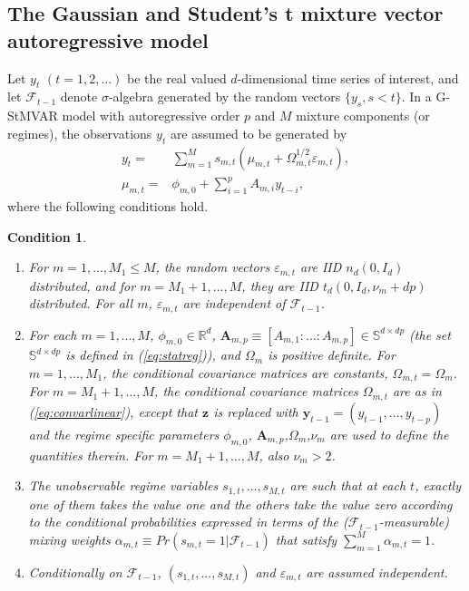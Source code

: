\documentclass[nojss]{jss}
\newtheorem{condition}{Condition}
\begin{document}
\subsection{The Gaussian and Student's t mixture vector autoregressive model}

Let $y_t$ $(t=1,2,...)$ be the real valued $d$-dimensional time series of interest, and let $\mathcal{F}_{t-1}$ denote $\sigma$-algebra generated by the random vectors $\lbrace y_s, s<t \rbrace$. In a G-StMVAR model \citep{Virolainen2:2021} with autoregressive order $p$ and $M$ mixture components (or regimes),  the observations $y_t$ are assumed to be generated by
\begin{align}
y_t = & \sum_{m=1}^Ms_{m,t}(\mu_{m,t} + \Omega_{m,t}^{1/2}\varepsilon_{m,t}),\label{eq:def} \\
\mu_{m,t} = & \phi_{m,0} + \sum_{i=1}^pA_{m,i}y_{t-i},\label{eq:mu_mt}
\end{align}
where the following conditions hold.
%
\begin{condition}\label{cond:def}
\
\begin{enumerate}
\item For $m=1,...,M_1\leq M$,  the random vectors $\varepsilon_{m,t}$ are IID $n_d(0, I_d)$ distributed,  and for $m=M_1+1,..., M$, they are IID $t_d(0, I_d,\nu_m + dp)$ distributed. For all $m$,  $\varepsilon_{m,t}$ are independent of $\mathcal{F}_{t-1}$.
\item For each $m=1,...,M$‚ $\phi_{m,0}\in\mathbb{R}^d$,  $\boldsymbol{A}_{m,p} \equiv [A_{m,1}:...:A_{m,p}]\in\mathbb{S}^{d\times dp}$ (the set $\mathbb{S}^{d\times dp}$ is defined in (\ref{eq:statreg})),  and $\Omega_m$ is positive definite.  For $m=1,...,M_1$,  the conditional covariance matrices are constants, $\Omega_{m,t}=\Omega_m$.  For $m=M_1+1,...,M$,  the conditional covariance matrices $\Omega_{m,t}$ are as in (\ref{eq:convarlinear}), except that $\boldsymbol{z}$ is replaced with $\boldsymbol{y}_{t-1}=(y_{t-1},...,y_{t-p})$ and the regime specific parameters $\phi_{m,0}$, $\boldsymbol{A}_{m,p}$,$\Omega_m$,$\nu_m$ are used to define the quantities therein.  For $m=M_1+1,...,M$, also  $\nu_m>2$.
\item The unobservable regime variables $s_{1,t},...,s_{M,t}$ are such that at each $t$, exactly one of them takes the value one and the others take the value zero according to the conditional probabilities expressed in terms of the ($\mathcal{F}_{t-1}$-measurable) mixing weights $\alpha_{m,t}\equiv Pr(s_{m,t}=1|\mathcal{F}_{t-1})$ that satisfy $\sum_{m=1}^M\alpha_{m,t}=1$.
\item Conditionally on $\mathcal{F}_{t-1}$,  $(s_{1,t},...,s_{M,t})$ and $\varepsilon_{m,t}$ are assumed independent.
\end{enumerate}
\end{condition}
\end{document}

